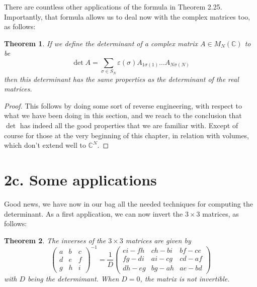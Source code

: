 \documentclass[12pt]{amsbook}
\newtheorem{theorem}{Theorem}[chapter]
\begin{document}
There are countless other applications of the formula in Theorem 2.25. Importantly, that formula allows us to deal now with the complex matrices too, as follows:


\begin{theorem}
If we define the determinant of a complex matrix $A\in M_N(\mathbb C)$ to be
$$\det A=\sum_{\sigma\in S_N}\varepsilon(\sigma)A_{1\sigma(1)}\ldots A_{N\sigma(N)}$$
then this determinant has the same properties as the determinant of the real matrices.
\end{theorem}

\begin{proof}
This follows by doing some sort of reverse engineering, with respect to what we have been doing in this section, and we reach to the conclusion that $\det$ has indeed all the good properties that we are familiar with. Except of course for those at the very beginning of this chapter, in relation with volumes, which don't extend well to $\mathbb C^N$.
\end{proof}

\section*{2c. Some applications}

Good news, we have now in our bag all the needed techniques for computing the determinant. As a first application, we can now invert the $3\times3$ matrices, as follows:


\begin{theorem}
The inverses of the $3\times3$ matrices are given by
$$\begin{pmatrix}a&b&c\\ d&e&f\\ g&h&i\end{pmatrix}^{-1}
=\frac{1}{D}\begin{pmatrix}ei-fh&ch-bi&bf-ce\\ fg-di&ai-cg&cd-af\\ dh-eg&bg-ah&ae-bd\end{pmatrix}$$
with $D$ being the determimant. When $D=0$, the matrix is not invertible.
\end{theorem}
\end{document}
